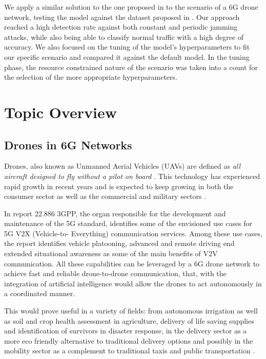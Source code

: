 \documentclass[futureinternet,article,submit,pdftex,moreauthors]{Definitions/mdpi}
\begin{document}
We apply a similar solution to the one proposed in \cite{HybridJammingDetection-Hong} to the scenario of a 6G drone network, testing the model against the dataset proposed in \cite{JammingDetectionIoT-Hussain}.
Our approach reached a high detection rate against both constant and periodic jamming attacks, while also being able to classify normal traffic with a high degree of accuracy. We also focused on the tuning of the model's hyperparameters to fit our specific scenario and compared it 
against the default model. In the tuning phase, the resource constrained nature of the scenario was taken into a count for the selection of the more appropriate hyperparameters.

\section{Topic Overview}

\subsection{Drones in 6G Networks}

Drones, also known as Unmanned Aerial Vehicles (UAVs) are defined as \textit{all aircraft designed to fly
without a pilot on board} \cite{DronesEC}. This technology has experienced rapid growth in recent years and is expected to 
keep growing in both the consumer sector as well as the commercial and military sectors \cite{DronesStatisticsLaricchia}.

In report 22.886 \cite{5GV2XSultan} 3GPP, the organ responsible for the development and maintenance of the 5G standard, identifies some of the envisioned use cases for 5G V2X (Vehicle-to-
Everything) communication services. Among these use cases, the report identifies vehicle platooning, advanced and remote driving end extended situational awareness as some of the main benefits
of V2V communication. All these capabilities can be leveraged by a 6G drone network to achieve fast and reliable drone-to-drone communication, that, with the integration of artificial intelligence 
would allow the drones to act autonomously in a coordinated manner. 

This would prove useful in a variety of fields: from autonomous irrigation as well as soil and crop health assessment in agriculture, 
delivery of life saving supplies and identification of survivors in disaster response, in the delivery sector as a more eco friendly alternative to traditional 
delivery options and possibly in the mobility sector as a complement to traditional taxis and public transportation \cite{DroneCommHassija}. 
\end{document}
